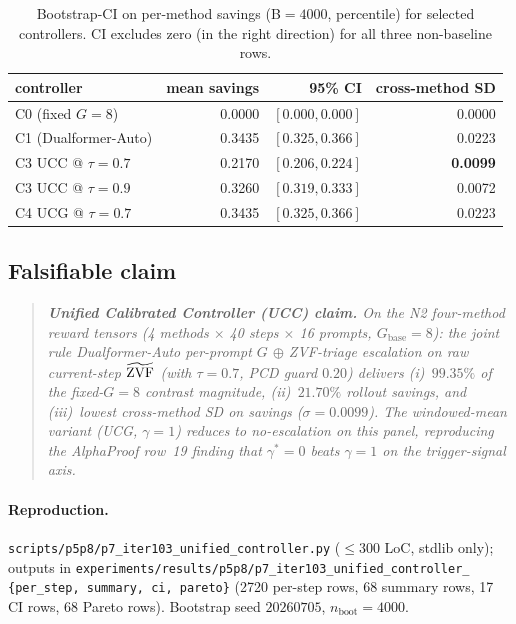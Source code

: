 \begin{table}[t]
\centering\small
\caption{Bootstrap-CI on per-method savings (B$=4000$, percentile) for
selected controllers.  CI excludes zero (in the right direction) for
all three non-baseline rows.}
\label{tab:p7-iter103-ci}
\vspace{2pt}
\begin{tabular}{lrrr}
\toprule
controller & mean savings & 95\% CI & cross-method SD \\
\midrule
C0 (fixed $G{=}8$)        &  0.0000 & $[0.000, 0.000]$ & 0.0000 \\
C1 (Dualformer-Auto)      &  0.3435 & $[0.325, 0.366]$ & 0.0223 \\
C3 UCC @ $\tau{=}0.7$    &  0.2170 & $[0.206, 0.224]$ & \textbf{0.0099} \\
C3 UCC @ $\tau{=}0.9$    &  0.3260 & $[0.319, 0.333]$ & 0.0072 \\
C4 UCG @ $\tau{=}0.7$    &  0.3435 & $[0.325, 0.366]$ & 0.0223 \\
\bottomrule
\end{tabular}
\end{table}

\subsection{Falsifiable claim}

\begin{quote}\itshape
\textbf{Unified Calibrated Controller (UCC) claim.}
On the N2 four-method reward tensors (4 methods $\times$ 40 steps
$\times$ 16 prompts, $G_{\mathrm{base}}{=}8$):
the joint rule \emph{Dualformer-Auto per-prompt $G$ $\oplus$
ZVF-triage escalation on raw current-step $\widetilde{\mathrm{ZVF}}$ (with $\tau{=}0.7$,
PCD guard $0.20$)}
delivers (i)~$99.35\%$ of the fixed-$G{=}8$ contrast magnitude, (ii)~$21.70\%$
rollout savings, and (iii)~lowest cross-method SD on savings
($\sigma{=}0.0099$).  The windowed-mean variant (UCG, $\gamma{=}1$)
reduces to no-escalation on this panel, reproducing the AlphaProof row~19
finding that $\gamma^*{=}0$ beats $\gamma{=}1$ on the
trigger-signal axis.
\end{quote}

\paragraph{Reproduction.}
\texttt{scripts/p5p8/p7\_iter103\_unified\_controller.py}
($\le 300$ LoC, stdlib only); outputs in
\texttt{experiments/results/p5p8/p7\_iter103\_unified\_controller\_%
\{per\_step, summary, ci, pareto\}} (2720 per-step rows, 68 summary rows,
17 CI rows, 68 Pareto rows).
Bootstrap seed $20260705$, $n_{\mathrm{boot}}{=}4000$.
